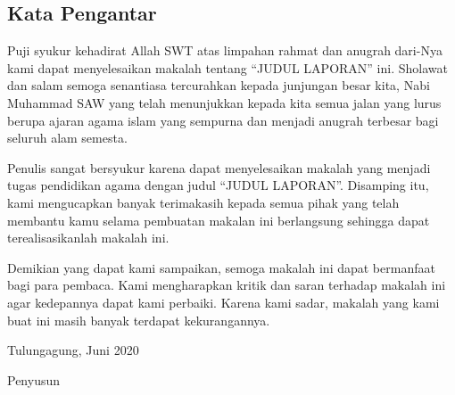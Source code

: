 \begin{center}
\section{Kata Pengantar}
\end{center}

Puji syukur kehadirat Allah SWT atas limpahan rahmat dan anugrah dari-Nya kami dapat menyelesaikan makalah tentang “JUDUL LAPORAN” ini. Sholawat dan salam semoga senantiasa tercurahkan kepada junjungan besar kita, Nabi Muhammad SAW yang telah menunjukkan kepada kita semua jalan yang lurus berupa ajaran agama islam yang sempurna dan menjadi anugrah terbesar bagi seluruh alam semesta.


Penulis sangat bersyukur karena dapat menyelesaikan makalah yang menjadi tugas pendidikan agama dengan judul “JUDUL LAPORAN”. Disamping itu, kami mengucapkan banyak terimakasih kepada semua pihak yang telah membantu kamu selama pembuatan makalan ini berlangsung sehingga dapat terealisasikanlah makalah ini.


Demikian yang dapat kami sampaikan, semoga makalah ini dapat bermanfaat bagi para pembaca. Kami mengharapkan kritik dan saran terhadap makalah ini agar kedepannya dapat kami perbaiki. Karena kami sadar, makalah yang kami buat ini masih banyak terdapat kekurangannya.

\bigskip
\bigskip

\begin{flushright}
Tulungagung, Juni 2020

\bigskip
\bigskip

Penyusun
\end{flushright}
